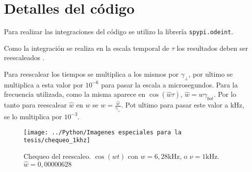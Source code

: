 \section{Detalles del código}

	Para realizar las integraciones del código se utilizo la librería \texttt{spypi.odeint}.
	
	Como la integración se realiza en la  escala temporal de $\tau$ los resultados deben ser reescaleados .
	
	Para reescalear los tiempos se multiplica a los mismos por $\gamma_{\bot}$, por ultimo se multiplica a esta valor por $10^{-6}$ para pasar la escala a microsegundos.
	Para la frecuencia utilizada, como la misma aparece en $\cos(\hat{w}\tau)$, $\hat{w}=w \gamma_{bot}$. Por lo tanto para reescalear $\hat{w}$ en $w$ se $w=\frac{\hat{w}}{\gamma_{\bot}}$. Pot ultimo para pasar este valor a kHz, se lo multiplica por  $10^{-3}$.
	
	\begin{figure}
		\texttt{[image: ../Python/Imagenes especiales para la tesis/chequeo\_1khz]}
		\caption{Chequeo del reescaleo. $\cos(wt)$ con $w=6,28$kHz, o $\nu = 1$kHz. $\hat{w}=0,00000628$}
	\end{figure}
	
	